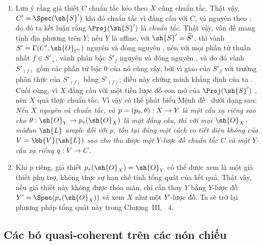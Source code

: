 \documentclass[oneside,10pt]{amsart}
\makeatletter
\newcommand{\ega@arrow}[2]{\mathchoice{#1}{#2}{#2}{#2}}
\renewcommand{\to}{\ega@arrow{\longrightarrow}{\rightarrow}}
\let\EGAOriginalLabel\label
\renewcommand{\label}[1]{\phantomsection\EGAOriginalLabel{#1}}
\makeatother
\begin{document}
\begin{remark}[8.11.8]
\label{II.8.11.8}
\begin{enumerate}
  \item[\rm{(i)}] Lưu ý rằng giả thiết $C$ chuẩn tắc kéo theo $X$ cũng chuẩn tắc.
  Thật vậy, $C'=\Spec(\sh{S}')$ khi đó chuẩn tắc vì đẳng cấu với $C$, và nguyên theo ; do đó ta kết luận rằng $\Proj(\sh{S}')$ là \emph{chuẩn tắc}.
  Thật vậy, vấn đề mang tính địa phương trên $Y$;
  nếu $Y$ là affine, với $\sh{S}'=\widetilde{S'}$, thì vành $S'=\Gamma(C',\sh{O}_{C'})$ nguyên và đóng nguyên , nên với mọi phần tử thuần nhất $f\in S'_+$, vành phân bậc $S'_f$ nguyên và đóng nguyên \cite[t.~I, p.~257 và 261]{I-13}, và do đó vành $S'_{(f)}$ gồm các phần tử bậc 0 của nó cũng vậy, bởi vì giao của $S'_f$ với trường phân thức của $S'_{(f)}$ bằng $S'_{(f)}$;
  điều này chứng minh khẳng định của ta .
  Cuối cùng, vì $X$ đẳng cấu với một tiền lược đồ con mở của $\Proj(\sh{S}')$ , nên $X$ quả thực chuẩn tắc.
  Vì vậy có thể phát biểu Mệnh đề~ dưới dạng sau:
  \emph{Nếu $X$ nguyên và chuẩn tắc, và $p=(p_0,\theta):X\to Y$ là một cấu xạ riêng sao cho $\theta:\sh{O}_Y\to p_*(\sh{O}_X)$ là một đẳng cấu, thì với mọi $\sh{O}_X$-môđun $\sh{L}$ ample đối với $p$, tồn tại đúng một cách co tiết diện không của $V=\bb{V}(\sh{L})$ sao cho thu được một $Y$-lược đồ chuẩn tắc $C$ và một $Y$-cấu xạ riêng $q:V\to C$.}
  \item[\rm{(ii)}] Khi $p$ riêng, giả thiết $p_*(\sh{O}_X)=\sh{O}_Y$ có thể được xem là một giả thiết phụ trợ, không thực sự hạn chế tính tổng quát của kết quả.
  Thật vậy, nếu giả thiết này không được thỏa mãn, chỉ cần thay $Y$ bằng $Y$-lược đồ $Y'=\Spec(p_*(\sh{O}_X))$ và xem $X$ như một $Y'$-lược đồ.
  Ta sẽ trở lại phương pháp tổng quát này trong Chương~III, \textsection~4.
\end{enumerate}
\end{remark}

\subsection{Các bó quasi-coherent trên các nón chiếu}
\label{subsection:II.8.12}
\end{document}
